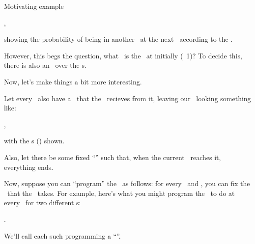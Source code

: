 \documentclass{rl_theory}
\begin{document}
\begin{part} {Motivating example}
\begin{itemize}
\begin{center}
,
      \end{center}
  \end{itemize}
  showing the probability of 
  being in another \til\ at 
  the next \stp\ according to the \trd.

  However, this begs the question, 
  what \til\ is the \agt\ at initially (\stp\ 1)? 
  To decide this, there is also an \ind\ over the \til{}s.

  \newpage
  Now, let's make things a bit more interesting. 

  Let every \til\ also have a \rwd\ that 
  the \agt\ recieves from it, 
  leaving our \brd\ looking something like:

  \begin{center}
    ,
  \end{center}
  with the \rwd{}s 
  () shown.

  Also, let there be some fixed ``\lmt'' such that,
  when the current \stp\ reaches it, everything ends.

  Now, suppose you can ``program'' the \agt\ as follows: 
  for every \til\ and \stp, you can fix the \act\ that the \agt\ takes.
  For example, here's what you might program the \agt\ to do 
  at every \til\ for two different \stp{}s:
  \begin{center}
    \hspace{1cm}
    .
  \end{center}
  We'll call each such programming a ``\str''. 


\end{part}
\end{document}
